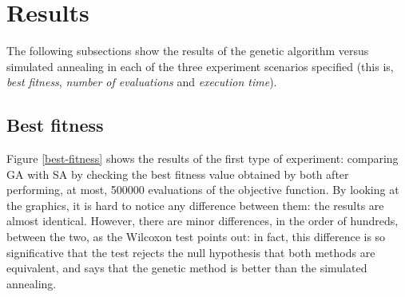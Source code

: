 \documentclass{article}[12pt]
\begin{document}
	\section{Results} \label{Results}
	
	The following subsections show the results of the genetic algorithm versus simulated annealing in each of the three experiment scenarios specified (this is, \textit{best fitness}, \textit{number of evaluations} and \textit{execution time}).
	
	\subsection{Best fitness}
	
	Figure \ref{best-fitness} shows the results of the first type of experiment: comparing GA with SA by checking the best fitness value obtained by both after performing, at most, 500000 evaluations of the objective function. 
\bigbreak	
	By looking at the graphics, it is hard to notice any difference between them: the results are almost identical. However, there are minor differences, in the order of hundreds, between the two, as the Wilcoxon test points out: in fact, this difference is so significative that the test rejects the null hypothesis that both methods are equivalent, and says that the genetic method is better than the simulated annealing.
	
\end{document}

